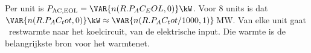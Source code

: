 \begin{resultaat}
Per unit is $P_\mathrm{AC,EOL} = \VAR{n(R.P_AC_EOL,0)}\kW$. Voor 8 units is dat
$\VAR{n(R.P_AC_tot,0)}\kW \approx \VAR{n(R.P_AC_tot/1000,1)}$\,MW. Van elke unit gaat \kW\
restwarmte naar het koelcircuit,  van de elektrische input. Die warmte is de
belangrijkste bron voor het warmtenet.
\end{resultaat}
